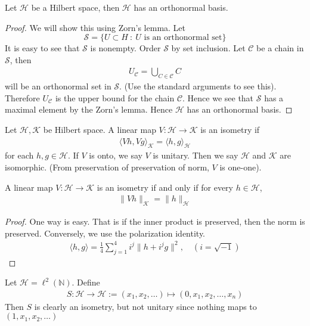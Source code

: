 \begin{theorem}
  Let $\mathcal{H}$ be a Hilbert space, then $\mathcal{H}$ has an
  orthonormal basis.
\end{theorem}
\begin{proof}
  We will show this using Zorn's lemma. Let $$\mathscr{S} = \{ U \subset H
  \ : \  U \textrm{ is an orthonormal set} \}$$
  It is easy to see that $\mathscr{S}$ is nonempty. Order
  $\mathscr{S}$ by set inclusion. Let $\mathscr{C}$ be a chain in
  $\mathscr{S}$, then
  \begin{align*}
    U_{\mathscr{C}} = \bigcup_{C \in \mathscr{C}} C
  \end{align*}
  will be an orthonormal set in $\mathscr{S}$. (Use the standard
  arguments to see this). Therefore $U_{\mathscr{C}}$ is the upper
  bound for the chain $\mathscr{C}$. Hence we see that $\mathscr{S}$ has a
  maximal element by the Zorn's lemma. Hence $\mathcal{H}$ has an
  orthonormal basis.
\end{proof}

\begin{definition}
  Let $\mathcal{H}, \mathcal{K}$ be Hilbert space. A linear map $V:
  \mathcal{H} \to \mathcal{K}$ is an isometry if
  \begin{align*}
    \langle Vh , Vg \rangle_{\mathcal{K}} = \langle h , g \rangle_{
    \mathcal{H}}
  \end{align*}
  for each $h, g \in \mathcal{H}$.
  If $V$ is onto, we say $V$ is unitary. Then we say $\mathcal{H}$
  and $\mathcal{K}$ are isomorphic.
  (From preservation of preservation of norm, $V$ is one-one).
\end{definition}

\begin{proposition}
  A linear map $V: \mathcal{H} \to \mathcal{K}$ is an isometry if and
  only if for every $h \in \mathcal{H}$,
  \begin{align*}
    \|Vh\|_{\mathcal{K}} = \|h\|_{\mathcal{H}}
  \end{align*}
\end{proposition}
\begin{proof}
  One way is easy. That is if the inner product is preserved, then
  the norm is preserved. Conversely, we use the polarization identity.
  \begin{align*}
    \langle h, g \rangle = \frac{1}{4}\sum_{j = 1}^{4} i^j\|h + i^j
    g\|^2,  \quad ( i = \sqrt{-1})
  \end{align*}
\end{proof}

\begin{example}
  Let $\mathcal{H} = \ell^{2}(\mathbb{N})$. Define
  \begin{align*}
    S : \mathcal{H} \to \mathcal{H} := (x_1 , x_2 , \ldots) \mapsto
    (0, x_1 , x_2 , \ldots , x_n)
  \end{align*}
  Then $S$ is clearly an isometry, but not unitary since nothing maps
  to $(1, x_1 , x_2 , \ldots)$
\end{example}
